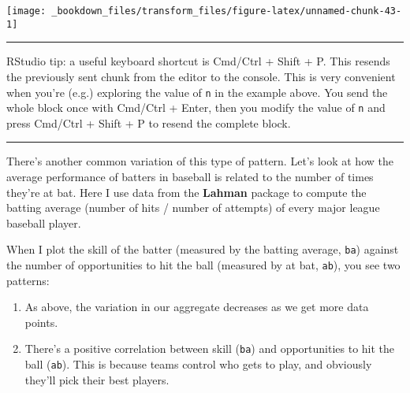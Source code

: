 \documentclass[]{book}
\newenvironment{Shaded}{\begin{snugshade}}{\end{snugshade}}
\newcommand{\KeywordTok}[1]{\textcolor[rgb]{0.13,0.29,0.53}{\textbf{{#1}}}}
\newcommand{\DataTypeTok}[1]{\textcolor[rgb]{0.13,0.29,0.53}{{#1}}}
\newcommand{\DecValTok}[1]{\textcolor[rgb]{0.00,0.00,0.81}{{#1}}}
\newcommand{\StringTok}[1]{\textcolor[rgb]{0.31,0.60,0.02}{{#1}}}
\newcommand{\NormalTok}[1]{{#1}}
\begin{document}
\begin{Shaded}
\end{Shaded}

\begin{center}\texttt{[image: \_bookdown\_files/transform\_files/figure-latex/unnamed-chunk-43-1]} \end{center}

\begin{center}\rule{0.5\linewidth}{\linethickness}\end{center}

RStudio tip: a useful keyboard shortcut is Cmd/Ctrl + Shift + P. This
resends the previously sent chunk from the editor to the console. This
is very convenient when you're (e.g.) exploring the value of \texttt{n}
in the example above. You send the whole block once with Cmd/Ctrl +
Enter, then you modify the value of \texttt{n} and press Cmd/Ctrl +
Shift + P to resend the complete block.

\begin{center}\rule{0.5\linewidth}{\linethickness}\end{center}

There's another common variation of this type of pattern. Let's look at
how the average performance of batters in baseball is related to the
number of times they're at bat. Here I use data from the \textbf{Lahman}
package to compute the batting average (number of hits / number of
attempts) of every major league baseball player.

When I plot the skill of the batter (measured by the batting average,
\texttt{ba}) against the number of opportunities to hit the ball
(measured by at bat, \texttt{ab}), you see two patterns:

\begin{enumerate}
\def\labelenumi{\arabic{enumi}.}
\item
  As above, the variation in our aggregate decreases as we get more data
  points.
\item
  There's a positive correlation between skill (\texttt{ba}) and
  opportunities to hit the ball (\texttt{ab}). This is because teams
  control who gets to play, and obviously they'll pick their best
  players.
\end{enumerate}
\end{document}
